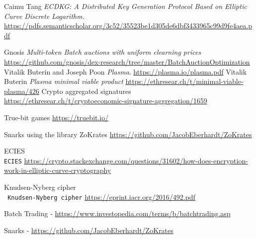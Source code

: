 \documentclass[11pt,parskip=full]{scrartcl}%
\begin{document}
\begin{thebibliography}{9}
Caimu Tang
\textit{ECDKG: A Distributed Key Generation Protocol Based on Elliptic
Curve Discrete Logarithm.}  
\href{https://pdfs.semanticscholar.org/3c52/35523be1d305de6dbf3433965c99d9fe4aea.pdf}{https://pdfs.semanticscholar.org/3c52/35523be1d305de6dbf3433965c99d9fe4aea.pdf}

Gnosis
\textit{Multi-token Batch auctions with uniform clearning prices} \newline
 \href{https://github.com/gnosis/dex-research/tree/master/BatchAuctionOptimization}
{https://github.com/gnosis/dex-research/tree/master/BatchAuctionOptimization}
Vitalik Buterin and Joseph Poon
\textit{Plasma}.
 \href{https://plasma.io/plasma.pdf}
{https://plasma.io/plasma.pdf}
Vitalik Buterin
\textit{Plasma minimal viable product}
 \href{https://ethresear.ch/t/minimal-viable-plasma/426}
 {https://ethresear.ch/t/minimal-viable-plasma/426}
Crypto aggregated signatures
\\\texttt{}
 \href{https://ethresear.ch/t/cryptoeconomic-signature-aggregation/1659}{https://ethresear.ch/t/cryptoeconomic-signature-aggregation/1659}

True-bit games
 \href{https://truebit.io/}{https://truebit.io/}

Snarks using the library ZoKrates
 \href{https://github.com/JacobEberhardt/ZoKrates}{https://github.com/JacobEberhardt/ZoKrates}

ECIES
\\\texttt{ECIES}
 \href{https://crypto.stackexchange.com/questions/31602/how-does-encryption-work-in-elliptic-curve-cryptography}{https://crypto.stackexchange.com/questions/31602/how-does-encryption-work-in-elliptic-curve-cryptography}

Knudsen-Nyberg cipher
\\\texttt{ Knudsen-Nyberg cipher}
 \href{https://eprint.iacr.org/2016/492.pdf}{https://eprint.iacr.org/2016/492.pdf}


Batch Trading - \href{https://www.investopedia.com/terms/b/batchtrading.asp}{https://www.investopedia.com/terms/b/batchtrading.asp}

 Snarks - \href{https://github.com/JacobEberhardt/ZoKrates}{https://github.com/JacobEberhardt/ZoKrates}

\end{thebibliography}
\end{document}
